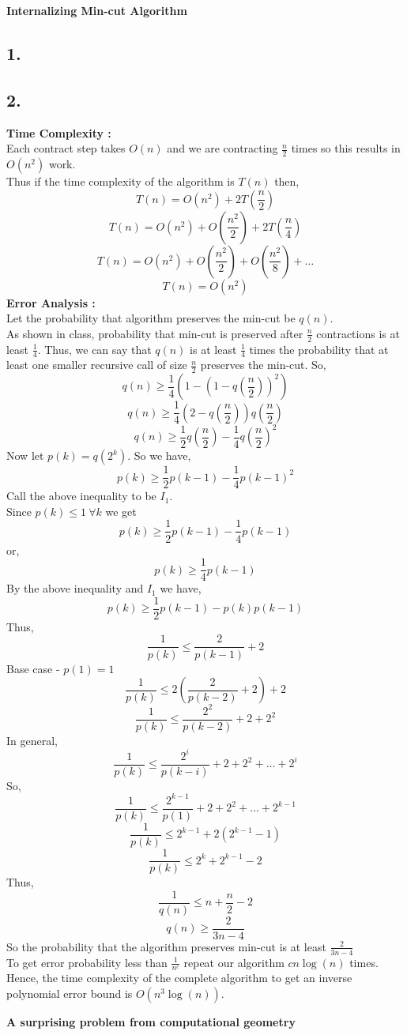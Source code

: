 \documentclass[a4paper]{article}
\begin{document}
\begin{question}
\textbf{Internalizing Min-cut Algorithm}
\end{question}
\subsection*{1.}

\subsection*{2.}
\textbf{Time Complexity :}\\
Each contract step takes $O(n)$ and we are contracting $\frac{n}{2}$ times so this results in $O(n^2)$ work.\\
Thus if the time complexity of the algorithm is $T(n)$ then,
$$T(n) = O(n^2) + 2T(\frac{n}{2})$$
$$T(n) = O(n^2) + O(\frac{n^2}{2}) + 2T(\frac{n}{4})$$
$$T(n) = O(n^2) + O(\frac{n^2}{2}) + O(\frac{n^2}{8}) + \dots$$
$$T(n) = O(n^2)$$
\textbf{Error Analysis :}\\
Let the probability that algorithm preserves the min-cut be $q(n)$.\\
As shown in class, probability that min-cut is preserved after $\frac{n}{2}$ contractions is at least $\frac{1}{4}$.
Thus, we can say that $q(n)$ is at least $\frac{1}{4}$ times the probability that at least one smaller recursive call of size $\frac{n}{2}$ preserves the min-cut.
So,
$$q(n) \geq \frac{1}{4}\left(1-\left(1-q\left(\frac{n}{2}\right)\right)^2\right)$$
$$q(n) \geq \frac{1}{4}\left(2 - q\left(\frac{n}{2}\right)\right)q\left(\frac{n}{2}\right)$$
$$q(n) \geq \frac{1}{2}q\left(\frac{n}{2}\right) - \frac{1}{4}q\left(\frac{n}{2}\right)^2$$
Now let $p(k) = q(2^k)$. So we have,
$$p(k) \geq \frac{1}{2}p\left(k-1\right) - \frac{1}{4}p\left(k-1\right)^2$$
Call the above inequality to be $I_1$.\\
Since $p(k) \leq 1\ \forall k$ we get $$p(k) \geq \frac{1}{2}p\left(k-1\right) - \frac{1}{4}p\left(k-1\right)$$
or,
$$p(k) \geq \frac{1}{4}p\left(k-1\right)$$
By the above inequality and $I_1$ we have,
$$p(k) \geq \frac{1}{2}p\left(k-1\right) - p(k)p\left(k-1\right)$$
Thus,
$$\frac{1}{p(k)} \leq \frac{2}{p(k-1)} + 2$$
Base case - $p(1) = 1$
$$\frac{1}{p(k)} \leq 2\left(\frac{2}{p(k-2)} + 2\right) + 2$$
$$\frac{1}{p(k)} \leq \frac{2^2}{p(k-2)} + 2 + 2^2$$
In general,
$$\frac{1}{p(k)} \leq \frac{2^i}{p(k-i)} + 2 + 2^2 + \dots + 2^i$$
So,
$$\frac{1}{p(k)} \leq \frac{2^{k-1}}{p(1)} + 2 + 2^2 + \dots + 2^{k-1}$$
$$\frac{1}{p(k)} \leq 2^{k-1} + 2(2^{k-1}-1)$$
$$\frac{1}{p(k)} \leq 2^k + 2^{k-1} - 2$$
Thus,
$$\frac{1}{q(n)} \leq n + \frac{n}{2} - 2$$
$$q(n) \geq \frac{2}{3n - 4}$$
So the probability that the algorithm preserves min-cut is at least $\frac{2}{3n - 4}$\\
To get error probability less than $\frac{1}{n^c}$ repeat our algorithm $cn\log(n)$ times.\\
Hence, the time complexity of the complete algorithm to get an inverse polynomial error bound is $O(n^3 \log(n))$.
\pagebreak
\begin{question}[]
\textbf{A surprising problem from computational geometry}
\end{question}
\end{document}
